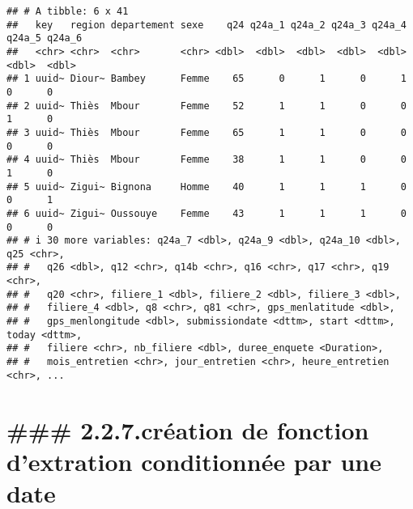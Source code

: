 \documentclass[
]{article}
\newenvironment{Shaded}{\begin{snugshade}}{\end{snugshade}}
\newcommand{\CommentTok}[1]{\textcolor[rgb]{0.56,0.35,0.01}{\textit{#1}}}
\newcommand{\ControlFlowTok}[1]{\textcolor[rgb]{0.13,0.29,0.53}{\textbf{#1}}}
\newcommand{\FunctionTok}[1]{\textcolor[rgb]{0.13,0.29,0.53}{\textbf{#1}}}
\newcommand{\NormalTok}[1]{#1}
\newcommand{\OtherTok}[1]{\textcolor[rgb]{0.56,0.35,0.01}{#1}}
\newcommand{\SpecialCharTok}[1]{\textcolor[rgb]{0.81,0.36,0.00}{\textbf{#1}}}
\begin{document}
\begin{verbatim}
## # A tibble: 6 x 41
##   key   region departement sexe    q24 q24a_1 q24a_2 q24a_3 q24a_4 q24a_5 q24a_6
##   <chr> <chr>  <chr>       <chr> <dbl>  <dbl>  <dbl>  <dbl>  <dbl>  <dbl>  <dbl>
## 1 uuid~ Diour~ Bambey      Femme    65      0      1      0      1      0      0
## 2 uuid~ Thiès  Mbour       Femme    52      1      1      0      0      1      0
## 3 uuid~ Thiès  Mbour       Femme    65      1      1      0      0      0      0
## 4 uuid~ Thiès  Mbour       Femme    38      1      1      0      0      1      0
## 5 uuid~ Zigui~ Bignona     Homme    40      1      1      1      0      0      1
## 6 uuid~ Zigui~ Oussouye    Femme    43      1      1      1      0      0      0
## # i 30 more variables: q24a_7 <dbl>, q24a_9 <dbl>, q24a_10 <dbl>, q25 <chr>,
## #   q26 <dbl>, q12 <chr>, q14b <chr>, q16 <chr>, q17 <chr>, q19 <chr>,
## #   q20 <chr>, filiere_1 <dbl>, filiere_2 <dbl>, filiere_3 <dbl>,
## #   filiere_4 <dbl>, q8 <chr>, q81 <chr>, gps_menlatitude <dbl>,
## #   gps_menlongitude <dbl>, submissiondate <dttm>, start <dttm>, today <dttm>,
## #   filiere <chr>, nb_filiere <dbl>, duree_enquete <Duration>,
## #   mois_entretien <chr>, jour_entretien <chr>, heure_entretien <chr>, ...
\end{verbatim}

\hypertarget{cruxe9ation-de-fonction-dextration-conditionnuxe9e-par-une-date}{%
\section{\#\#\# 2.2.7.création de fonction d'extration conditionnée par
une
date}\label{cruxe9ation-de-fonction-dextration-conditionnuxe9e-par-une-date}}

\begin{Shaded}
\end{Shaded}
\end{document}
